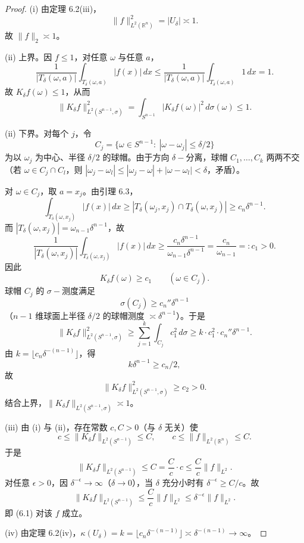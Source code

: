 \documentclass[11pt,a4paper]{article}
\theoremstyle{remark}
\begin{document}
		\begin{proof}
		(i) 由定理 6.2(iii)，
		\[
		\|f\|_{L^2(\mathbb R^n)}^2=|U_\delta|\asymp1.
		\]
		故 $\|f\|_2\asymp1$。
		
		(ii) 上界。因 $f\le1$，对任意 $\omega$ 与任意 $a$，
		\[
		\frac{1}{|T_\delta(\omega,a)|}\int_{T_\delta(\omega,a)}|f(x)|\,dx
		\le\frac{1}{|T_\delta(\omega,a)|}\int_{T_\delta(\omega,a)}1\,dx=1.
		\]
		故 $K_\delta f(\omega)\le1$，从而
		\[
		\|K_\delta f\|_{L^2(S^{n-1},\sigma)}^2
		=\int_{S^{n-1}}|K_\delta f(\omega)|^2\,d\sigma(\omega)\le1.
		\]
		
		(ii) 下界。对每个 $j$，令
		\[
		C_j=\bigl\{\omega\in S^{n-1}:\ |\omega-\omega_j|\le\delta/2\bigr\}
		\]
		为以 $\omega_j$ 为中心、半径 $\delta/2$ 的球帽。由于方向 $\delta-$分离，球帽 $C_1,\ldots,C_k$ 两两不交（若 $\omega\in C_j\cap C_l$，则 $|\omega_j-\omega_l|\le|\omega_j-\omega|+|\omega-\omega_l|<\delta$，矛盾）。
		
		对 $\omega\in C_j$，取 $a=x_j$。由引理 6.3，
		\[
		\int_{T_\delta(\omega,x_j)}|f(x)|\,dx\ge|T_\delta(\omega_j,x_j)\cap T_\delta(\omega,x_j)|\ge c_n\delta^{n-1}.
		\]
		而 $|T_\delta(\omega,x_j)|=\omega_{n-1}\delta^{n-1}$，故
		\[
		\frac{1}{|T_\delta(\omega,x_j)|}\int_{T_\delta(\omega,x_j)}|f(x)|\,dx
		\ge\frac{c_n\delta^{n-1}}{\omega_{n-1}\delta^{n-1}}=\frac{c_n}{\omega_{n-1}}=:c_1>0.
		\]
		因此
		\[
		K_\delta f(\omega)\ge c_1\qquad(\omega\in C_j).
		\]
		球帽 $C_j$ 的 $\sigma-$测度满足
		\[
		\sigma(C_j)\ge c_n''\delta^{n-1}
		\]
		（$n-1$ 维球面上半径 $\delta/2$ 的球帽测度 $\asymp\delta^{n-1}$）。于是
		\[
		\|K_\delta f\|_{L^2(S^{n-1},\sigma)}^2
		\ge\sum_{j=1}^k\int_{C_j}c_1^2\,d\sigma
		\ge k\cdot c_1^2\cdot c_n''\delta^{n-1}.
		\]
		由 $k=\lfloor c_n\delta^{-(n-1)}\rfloor$，得
		\[
		k\delta^{n-1}\ge c_n/2,
		\]
		故
		\[
		\|K_\delta f\|_{L^2(S^{n-1},\sigma)}^2\ge c_2>0.
		\]
		结合上界，$\|K_\delta f\|_{L^2(S^{n-1},\sigma)}\asymp1$。
		
		(iii) 由 (i) 与 (ii)，存在常数 $c,C>0$（与 $\delta$ 无关）使
		\[
		c\le\|K_\delta f\|_{L^2(S^{n-1})}\le C,\qquad
		c\le\|f\|_{L^2(\mathbb R^n)}\le C.
		\]
		于是
		\[
		\|K_\delta f\|_{L^2(S^{n-1})}
		\le C
		=\frac{C}{c}\cdot c
		\le\frac{C}{c}\|f\|_{L^2}.
		\]
		对任意 $\epsilon>0$，因 $\delta^{-\epsilon}\to\infty$（$\delta\to0$），当 $\delta$ 充分小时有 $\delta^{-\epsilon}\ge C/c$。故
		\[
		\|K_\delta f\|_{L^2(S^{n-1})}
		\le\frac{C}{c}\|f\|_{L^2}
		\le\delta^{-\epsilon}\|f\|_{L^2}.
		\]
		即 (6.1) 对该 $f$ 成立。
		
		(iv) 由定理 6.2(iv)，$\kappa(U_\delta)=k=\lfloor c_n\delta^{-(n-1)}\rfloor\asymp\delta^{-(n-1)}\to\infty$。
		\end{proof}
		
\end{document}
